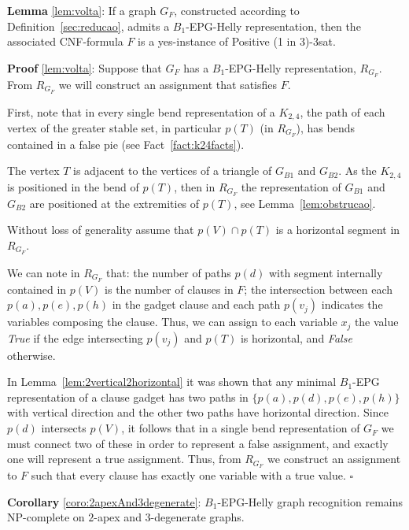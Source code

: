 \documentclass[9pt]{entcs}
\begin{document}
\begin{lema*}\textbf{Lemma} \ref{lem:volta}:
If a graph $G_F$, constructed according to Definition~\ref{sec:reducao}, admits a $B_1$-EPG-Helly representation, then the associated CNF-formula $F$ is a yes-instance of {\sc Positive (1 in 3)-3sat}.
\end{lema*}

\begin{prove*}\textbf{Proof} \ref{lem:volta}:
Suppose that $G_F$ has a $B_1$-EPG-Helly representation, $R_{G_F}$.  From $R_{G_F}$ we will construct an assignment that satisfies $F$. 

First, note that in every single bend representation of a $K_{2,4}$, the path of each vertex of the greater stable set, in particular $p(T)$ (in $R_{G_F}$), has bends contained in a false pie (see Fact~\ref{fact:k24facts}). 


The vertex $T$ is adjacent to the vertices of a triangle of $G_{B1}$ and $G_{B2}$. As the $K_{2,4}$ is positioned in the bend of $p(T)$, then in $R_{G_F}$ the representation of $G_{B1}$ and $G_{B2}$ are positioned at the extremities of $p(T)$, see Lemma~\ref{lem:obstrucao}.   


Without loss of generality assume that $p(V) \cap p(T)$ is a horizontal segment in $R_{G_F}$.

We can note in $R_{G_F}$ that: the number of paths $p(d)$ with segment internally contained in $p(V)$ is the number of clauses in $F$; the intersection between each $p(a), p(e), p(h)$ in the gadget clause and each path $p(v_j)$ indicates the variables composing the clause. Thus, we can assign to each variable $ x_{j}$ the value \textit{True} if the edge intersecting $p(v_j)$ and $p(T)$ is horizontal, and \textit{False} otherwise. 


In Lemma~\ref{lem:2vertical2horizontal} it was shown that any minimal $B_1$-EPG representation of a clause gadget has two paths in $\{p(a), p(d), p(e), p(h)\}$ with vertical direction and the other two paths have horizontal direction. Since $p(d)$ intersects $p(V)$, it follows that in a single bend representation of $G_F$ we must connect two of these in order to represent a false assignment, and exactly one will represent a true assignment. Thus, from $R_{G_F}$ we construct an assignment to $F$ such that every clause has exactly one variable with a true value.  
$\square$ \end{prove*}

\begin{coro*}\textbf{Corollary} \ref{coro:2apexAnd3degenerate}:
{\sc $B_{1}$-EPG-Helly graph recognition} remains NP-complete on $2$-apex and $3$-degenerate graphs.
\end{coro*}
\end{document}

